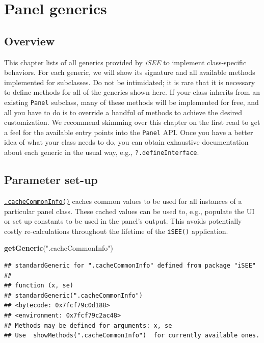 \documentclass[
]{book}
\newenvironment{Shaded}{\begin{snugshade}}{\end{snugshade}}
\newcommand{\KeywordTok}[1]{\textcolor[rgb]{0.13,0.29,0.53}{\textbf{#1}}}
\newcommand{\NormalTok}[1]{#1}
\newcommand{\StringTok}[1]{\textcolor[rgb]{0.31,0.60,0.02}{#1}}
\begin{document}
\hypertarget{api}{%
\chapter{Panel generics}\label{api}}

\hypertarget{overview}{%
\section{Overview}\label{overview}}

This chapter lists of all generics provided by \emph{\href{https://bioconductor.org/packages/3.11/iSEE}{iSEE}} to implement class-specific behaviors.
For each generic, we will show its signature and all available methods implemented for subclasses.
Do not be intimidated; it is rare that it is necessary to define methods for all of the generics shown here.
If your class inherits from an existing \texttt{Panel} subclass, many of these methods will be implemented for free, and all you have to do is to override a handful of methods to achieve the desired customization.
We recommend skimming over this chapter on the first read to get a feel for the available entry points into the \texttt{Panel} API.
Once you have a better idea of what your class needs to do, you can obtain exhaustive documentation about each generic in the usual way, e.g., \texttt{?.defineInterface}.

\hypertarget{parameter-set-up}{%
\section{Parameter set-up}\label{parameter-set-up}}

\href{https://isee.github.io/iSEE/reference/setup-generics.html}{\texttt{.cacheCommonInfo()}} caches common values to be used for all instances of a particular panel class.
These cached values can be used to, e.g., populate the UI or set up constants to be used in the panel's output.
This avoids potentially costly re-calculations throughout the lifetime of the \texttt{iSEE()} application.

\begin{Shaded}
\begin{Highlighting}[]
\KeywordTok{getGeneric}\NormalTok{(}\StringTok{".cacheCommonInfo"}\NormalTok{)}
\end{Highlighting}
\end{Shaded}

\begin{verbatim}
## standardGeneric for ".cacheCommonInfo" defined from package "iSEE"
## 
## function (x, se) 
## standardGeneric(".cacheCommonInfo")
## <bytecode: 0x7fcf79c0d188>
## <environment: 0x7fcf79c2ac48>
## Methods may be defined for arguments: x, se
## Use  showMethods(".cacheCommonInfo")  for currently available ones.
\end{verbatim}
\end{document}
